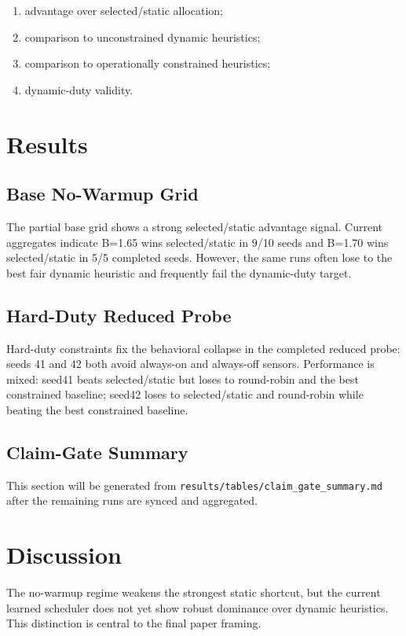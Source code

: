 \documentclass[11pt]{article}
\begin{document}
\begin{enumerate}
  \item advantage over selected/static allocation;
  \item comparison to unconstrained dynamic heuristics;
  \item comparison to operationally constrained heuristics;
  \item dynamic-duty validity.
\end{enumerate}

\section{Results}

\subsection{Base No-Warmup Grid}

The partial base grid shows a strong selected/static advantage signal. Current
aggregates indicate B=1.65 wins selected/static in 9/10 seeds and B=1.70 wins
selected/static in 5/5 completed seeds. However, the same runs often lose to
the best fair dynamic heuristic and frequently fail the dynamic-duty target.

\subsection{Hard-Duty Reduced Probe}

Hard-duty constraints fix the behavioral collapse in the completed reduced
probe: seeds 41 and 42 both avoid always-on and always-off sensors. Performance
is mixed: seed41 beats selected/static but loses to round-robin and the best
constrained baseline; seed42 loses to selected/static and round-robin while
beating the best constrained baseline.

\subsection{Claim-Gate Summary}

This section will be generated from
\texttt{results/tables/claim\_gate\_summary.md} after the remaining runs are
synced and aggregated.

\section{Discussion}

The no-warmup regime weakens the strongest static shortcut, but the current
learned scheduler does not yet show robust dominance over dynamic heuristics.
This distinction is central to the final paper framing.
\end{document}
